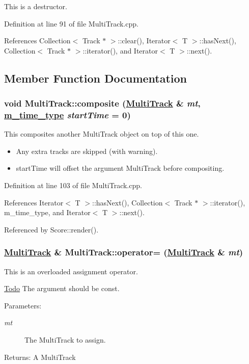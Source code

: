 This is a destructor. 

Definition at line 91 of file Multi\-Track.cpp.

References Collection$<$ Track $\ast$ $>$::clear(), Iterator$<$ T $>$::has\-Next(), Collection$<$ Track $\ast$ $>$::iterator(), and Iterator$<$ T $>$::next().

\subsection{Member Function Documentation}
\hypertarget{classMultiTrack_a5}{
\subsubsection[composite]{\setlength{\rightskip}{0pt plus 5cm}void Multi\-Track::composite (\hyperlink{classMultiTrack}{Multi\-Track} \& {\em mt}, \hyperlink{Types_8h_a2}{m\_\-time\_\-type} {\em start\-Time} = 0)}}
\label{classMultiTrack_a5}


This composites another Multi\-Track object on top of this one.\begin{itemize}
\item Any extra tracks are skipped (with warning).\item start\-Time will offset the argument Multi\-Track before compositing. \end{itemize}


Definition at line 103 of file Multi\-Track.cpp.

References Iterator$<$ T $>$::has\-Next(), Collection$<$ Track $\ast$ $>$::iterator(), m\_\-time\_\-type, and Iterator$<$ T $>$::next().

Referenced by Score::render().\hypertarget{classMultiTrack_a3}{
\subsubsection[operator=]{\setlength{\rightskip}{0pt plus 5cm}\hyperlink{classMultiTrack}{Multi\-Track} \& Multi\-Track::operator= (\hyperlink{classMultiTrack}{Multi\-Track} \& {\em mt})}}
\label{classMultiTrack_a3}


This is an overloaded assignment operator. 

\begin{Desc}
\item[\hyperlink{todo__todo000009}{Todo}]The argument should be const.\end{Desc}
\begin{Desc}
\item[Parameters:]
\begin{description}
\item[{\em mt}]The Multi\-Track to assign. \end{description}
\end{Desc}
\begin{Desc}
\item[Returns:]A Multi\-Track \end{Desc}


